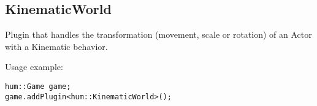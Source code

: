 \subsection{KinematicWorld}
Plugin that handles the transformation (movement, scale or rotation)
of an Actor with a Kinematic behavior.


Usage example:
\begin{lstlisting}[caption=KinematicWorld example]
hum::Game game;
game.addPlugin<hum::KinematicWorld>();
\end{lstlisting}
